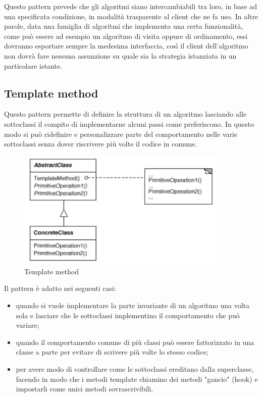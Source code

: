 Questo pattern prevede che gli algoritmi siano intercambiabili tra loro, in base ad una specificata condizione, in modalità trasparente al client che ne fa uso. In altre parole, data una famiglia di algoritmi che implementa una certa funzionalità, come può essere ad esempio un algoritmo di visita oppure di ordinamento, essi dovranno esportare sempre la medesima interfaccia, così il client dell'algoritmo non dovrà fare nessuna assunzione su quale sia la strategia istanziata in un particolare istante.

\subsection{Template method}
Questo pattern permette di definire la struttura di un algoritmo lasciando alle sottoclassi il compito di implementarne alcuni passi come preferiscono. In questo modo si può ridefinire e personalizzare parte del comportamento nelle varie sottoclassi senza dover riscrivere più volte il codice in comune.

\begin{figure}[H]
\includegraphics[width=0.9\textwidth]{res/img/DP/template}
\caption{Template method}
\end{figure}

Il pattern è adatto nei seguenti casi:
\begin{itemize}
\item quando si vuole implementare la parte invariante di un algoritmo una volta sola e lasciare che le sottoclassi implementino il comportamento che può variare;
\item quando il comportamento comune di più classi può essere fattorizzato in una classe a parte per evitare di scrivere più volte lo stesso codice;
\item per avere modo di controllare come le sottoclassi ereditano dalla superclasse, facendo in modo che i metodi template chiamino dei metodi "gancio" (hook) e impostarli come unici metodi sovrascrivibili.
\end{itemize}

